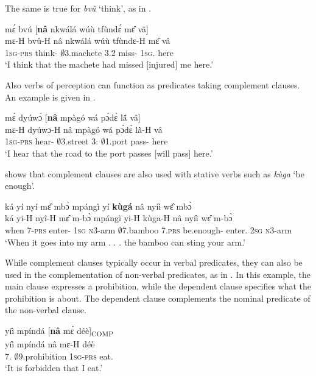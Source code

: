 \noindent The same is true for {\itshape bvû} `think', as in .


\ea\label{COMP4}
  \glll    mɛ́ bvú [{\bfseries nâ} nkwálá wúù tfùndɛ́ mɛ̂ vâ]\textsubscript{{\COMP}} \\
           mɛ-H bvû-H {\db}nâ nkwálá wúù tfùndɛ-H mɛ̂ vâ \\
              1\textsc{sg}-\textsc{prs} think-{\R} {\db}{\COMP} $\emptyset$3.machete 3.{\PST}2 miss-{\R} 1\textsc{sg}.{\OBJ} here \\
    \trans `I think that the machete had missed [injured] me here.'
\z

\noindent Also verbs of perception can function as predicates taking complement clauses. An example is given in .



\ea\label{COMP5} 
  \glll  mɛ́ dyúwɔ́ [{\bfseries nâ} mpàgó wá pɔ́dɛ̀ lã́ vâ]\textsubscript{{\COMP}}\\
        mɛ-H dyúwɔ-H {\db}nâ mpàgó wá pɔ́dɛ̀ lã̀-H vâ\\
            1\textsc{sg}-\textsc{prs} hear-{\R} {\db}{\COMP} $\emptyset$3.street 3:{\ATT} $\emptyset$1.port pass-{\R} here\\
    \trans `I hear that the road to the port passes [will pass] here.'
\z

 shows that complement clauses are also used with stative verbs such as {\itshape kùga} `be enough'.


\ea\label{kuga}
  \glll    ká yí nyí mɛ̂ mbɔ̀ mpángì yí {\bfseries kùgá} nâ nyíì wɛ̂ mbɔ̀ \\
           ká yi-H nyî-H mɛ̂ m-bɔ̀ mpángì yi-H kùga-H nâ nyíì wɛ̂ m-bɔ̀ \\
             when 7-\textsc{prs} enter-{\R} 1\textsc{sg} \textsc{n}3-arm $\emptyset$7.bamboo 7.\textsc{prs} be.enough-{\R} {\COMP} enter.{\SBJV} 2\textsc{sg} \textsc{n}3-arm \\
    \trans `When it goes into my arm . . . the bamboo can sting your arm.'
\z

While complement clauses typically occur in verbal predicates, they can also be used in the 
complementation of non-verbal predicates, as in .
In this example, the main clause expresses a prohibition, while the dependent clause specifies what the prohibition is about. The dependent clause complements the nominal predicate of the non-verbal clause.


\ea\label{BComp2} 
  \glll  yíì mpíndá [{\bfseries nâ} mɛ́ déè]\textsubscript{COMP} \\
         yíì mpíndá {\db}nâ mɛ-H déè \\
         7.{\COP}  $\emptyset$9.prohibition {\db}{\COMP} 1\textsc{sg}-\textsc{prs} eat.{\SBJV} \\
    \trans `It is forbidden that I eat.'
\z

